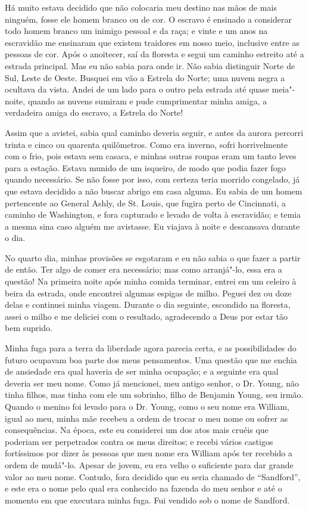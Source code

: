 Há muito estava decidido que não colocaria meu destino nas mãos de mais
ninguém, fosse ele homem branco ou de cor. O escravo é ensinado a
considerar todo homem branco um inimigo pessoal e da raça; e vinte e um
anos na escravidão me ensinaram que existem traidores em nosso meio,
inclusive entre as pessoas de cor. Após o anoitecer, saí da floresta e
segui um caminho estreito até a estrada principal. Mas eu não sabia para
onde ir. Não sabia distinguir Norte de Sul, Leste de Oeste. Busquei em
vão a Estrela do Norte; uma nuvem negra a ocultava da vista. Andei de um
lado para o outro pela estrada até quase meia"-noite, quando as nuvens
sumiram e pude cumprimentar minha amiga, a verdadeira amiga do escravo,
a Estrela do Norte!

Assim que a avistei, sabia qual caminho deveria seguir, e antes da
aurora percorri trinta e cinco ou quarenta quilômetros. Como era
inverno, sofri horrivelmente com o frio, pois estava sem casaca, e
minhas outras roupas eram um tanto leves para a estação. Estava munido
de um isqueiro, de modo que podia fazer fogo quando necessário. Se não
fosse por isso, com certeza teria morrido congelado, já que estava
decidido a não buscar abrigo em casa alguma. Eu sabia de um homem
pertencente ao General Ashly, de St. Louis, que fugira perto de
Cincinnati, a caminho de Washington, e fora capturado e levado de volta
à escravidão; e temia a mesma sina caso alguém me avistasse. Eu viajava
à noite e descansava durante o dia.

No quarto dia, minhas provisões se esgotaram e eu não sabia o que fazer
a partir de então. Ter algo de comer era necessário; mas como
arranjá"-lo, essa era a questão! Na primeira noite após minha comida
terminar, entrei em um celeiro à beira da estrada, onde encontrei
algumas espigas de milho. Peguei dez ou doze delas e continuei minha
viagem. Durante o dia seguinte, escondido na floresta, assei o milho e
me deliciei com o resultado, agradecendo a Deus por estar tão bem
suprido.

Minha fuga para a terra da liberdade agora parecia certa, e as
possibilidades do futuro ocupavam boa parte dos meus pensamentos. Uma
questão que me enchia de ansiedade era qual haveria de ser minha
ocupação; e a seguinte era qual deveria ser meu nome. Como já mencionei,
meu antigo senhor, o Dr. Young, não tinha filhos, mas tinha com ele um
sobrinho, filho de Benjamin Young, seu irmão. Quando o menino foi levado
para o Dr. Young, como o seu nome era William, igual ao meu, minha mãe
recebeu a ordem de trocar o meu nome ou sofrer as consequências. Na
época, este eu considerei um dos atos mais cruéis que poderiam ser
perpetrados contra os meus direitos; e recebi vários castigos
fortíssimos por dizer às pessoas que meu nome era William após ter
recebido a ordem de mudá"-lo. Apesar de jovem, eu era velho o suficiente
para dar grande valor ao meu nome. Contudo, fora decidido que eu seria
chamado de ``Sandford'', e este era o nome pelo qual era conhecido na
fazenda do meu senhor e até o momento em que executara minha fuga. Fui
vendido sob o nome de Sandford.

